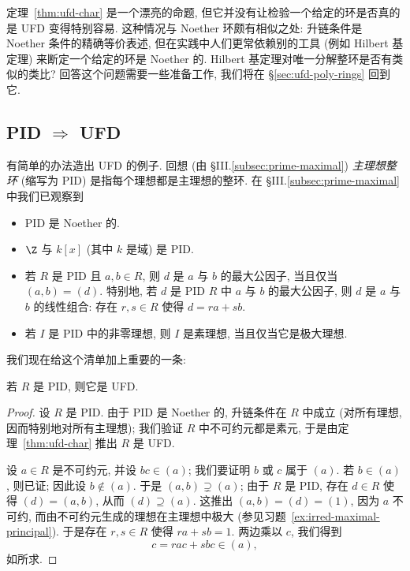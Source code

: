 \noindent 定理~\ref{thm:ufd-char} 是一个漂亮的命题, 但它并没有让检验一个给定的环是否真的是 UFD 变得特别容易. 这种情况与 Noether 环颇有相似之处:
升链条件是 Noether 条件的精确等价表述, 但在实践中人们更常依赖别的工具 (例如 Hilbert 基定理) 来断定一个给定的环是 Noether 的.
Hilbert 基定理对唯一分解整环是否有类似的类比? 回答这个问题需要一些准备工作, 我们将在 §\ref{sec:ufd-poly-rings} 回到它.

\subsection{PID \texorpdfstring{$\Rightarrow$}{=>} UFD}
\label{subsec:pid-ufd}

有简单的办法造出 UFD 的例子. 回想 (由 §III.\ref{subsec:prime-maximal}) \emph{主理想整环} (缩写为 PID) 是指每个理想都是主理想的整环. 在 §III.\ref{subsec:prime-maximal} 中我们已观察到
\begin{itemize}
\item PID 是 Noether 的.
\item $\Z$ 与 $k[x]$ (其中 $k$ 是域) 是 PID.
\item 若 $R$ 是 PID 且 $a,b\in R$, 则 $d$ 是 $a$ 与 $b$ 的最大公因子, 当且仅当 $(a,b)=(d)$. 特别地, 若 $d$ 是 PID $R$ 中 $a$ 与 $b$ 的最大公因子, 则 $d$ 是 $a$ 与 $b$ 的线性组合: 存在 $r,s\in R$ 使得 $d=ra+sb$.
\item 若 $I$ 是 PID 中的非零理想, 则 $I$ 是素理想, 当且仅当它是极大理想.
\end{itemize}
我们现在给这个清单加上重要的一条:

\begin{proposition}\label{prop:pid-ufd}
若 $R$ 是 PID, 则它是 UFD.
\end{proposition}

\begin{proof}
设 $R$ 是 PID. 由于 PID 是 Noether 的, 升链条件在 $R$ 中成立 (对所有理想, 因而特别地对所有主理想);
我们验证 $R$ 中不可约元都是素元, 于是由定理~\ref{thm:ufd-char} 推出 $R$ 是 UFD.

设 $a\in R$ 是不可约元, 并设 $bc\in (a)$; 我们要证明 $b$ 或 $c$ 属于 $(a)$. 若 $b\in (a)$, 则已证; 因此设 $b\notin (a)$.
于是 $(a,b)\supsetneq (a)$; 由于 $R$ 是 PID, 存在 $d\in R$ 使得 $(d)=(a,b)$, 从而 $(d)\supseteq (a)$. 这推出
$(a,b)=(d)=(1)$, 因为 $a$ 不可约, 而由不可约元生成的理想在主理想中极大 (参见习题~\ref{ex:irred-maximal-principal}). 于是存在 $r,s\in R$ 使得
$ra+sb=1$. 两边乘以 $c$, 我们得到
\[
c = rac + sbc \in (a),
\]
如所求.
\end{proof}

